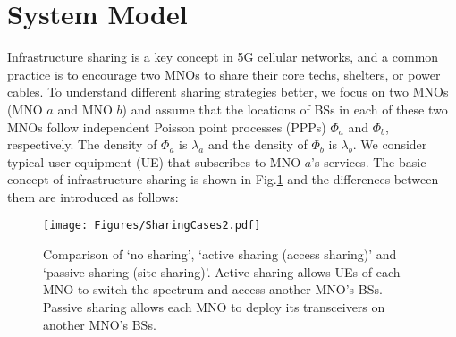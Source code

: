 \documentclass[final]{IEEEtran}
\begin{document}
\section{System Model} \label{sec:SysMod}


Infrastructure sharing is a key concept in 5G cellular networks, and a common practice is to encourage two MNOs to share their core techs, shelters, or power cables. To understand different sharing strategies better, we focus on two MNOs (MNO $a$ and MNO $b$) and assume that the locations of BSs in each of these two MNOs follow independent Poisson point processes (PPPs) $\Phi_a$ and $\Phi_b$, respectively. The density of $\Phi_a$ is  $\lambda_a$ and the density of $\Phi_b$ is $\lambda_b$. We consider typical user equipment (UE) that subscribes to MNO $a$'s services. The basic concept of infrastructure sharing is shown in Fig.\ref{fig:SharingCases} and the differences between them are introduced as follows: 
\begin{figure}[ht]
    \centering
    \texttt{[image: Figures/SharingCases2.pdf]}
    \caption{Comparison of `no sharing', `active sharing (access sharing)' and `passive sharing (site sharing)'. Active sharing allows UEs of each MNO to switch the spectrum and access another MNO's BSs. Passive sharing allows each MNO to deploy its transceivers on another MNO's BSs.}
    \label{fig:SharingCases}
\end{figure}
\end{document}
